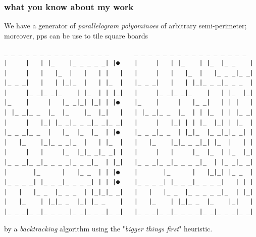 \documentclass[9pt]{beamer}
\begin{document}
\begin{frame}[fragile]
\frametitle{what you know about my work}
We have a generator of \textit{parallelogram polyominoes} of arbitrary
semi-perimeter; moreover, pps can be use to tile square boards
\begin{Verbatim}[baselinestretch=0.1, fontsize=\footnotesize]
 _ _ _ _ _ _ _ _ _ _ _ _ _ _ _       _ _ _ _ _ _ _ _ _ _ _ _ _ _ _ _
|     |   | |_    |_ _ _ _ _| |●    |     |   | |_    | |_  |_ _    |
|     |   |   |_  |   |   | |   |   |     |   |   |_  |   |_ _ _|_ _|
|_ _ _|   |   | |_|_  |   | |_  |   |_ _ _|   |   | |_|_ _ _|_ _ _  |
|     |_ _|_ _|_    | |_  | | |_|   |     |_ _|_ _|_    |   | |_  |_|
|_    |     |   |_ _|_| |_| | |●    |_    |     |   |_ _|   | | |   |
| |_ _|_ _  |_  |_    |_  |_|   |   | |_ _|_ _  |_  | | |_  | | |_ _|
|     |   |_| |_ _|_ _ _|_ _|_ _|   |     |   |_| | | |_  |_| | |_  |
|_ _ _|_ _  |   |_  |_  |_  | |●    |_ _ _|_ _  | |_|_  |_ _|_|_ _| |
|   |_    |_|_ _ _|_  |   | |_  |   |   |_    |_|_ _ _|_| |_  |   | |
|     |   |     |_  |_|_ _|_ _| |   |     |   |     |_  |_  | |_  |_|
|_ _ _|_ _|_ _ _ _|_ _ _|_  | |_|   |_ _ _|_ _|_ _ _ _|_  | |_ _|_ _|
|       |_      |   |_ _  | | |●    |       |_      |   |_|_| |_ _  |
|_ _ _ _| |_ _ _|_ _ _ _| | | |●    |_ _ _ _| |_ _ _|_ _ _ _|   | | |
|   |   |_ _  |_ _ _  | |_|_|_ _|   |   |   |_ _  |_ _ _ _ _|_  | |_|
|   |_    | |_|_ _  |_| |_ _    |   |   |_    | |_|_ _  |_    |_|   |
|_ _ _|_ _|_ _ _ _|_ _|_ _ _|_ _|   |_ _ _|_ _|_ _ _ _|_ _|_ _ _|_ _|
\end{Verbatim}
by a \textit{backtracking} algorithm using the "\textit{bigger things first}"
heuristic.
\end{frame}
\end{document}
